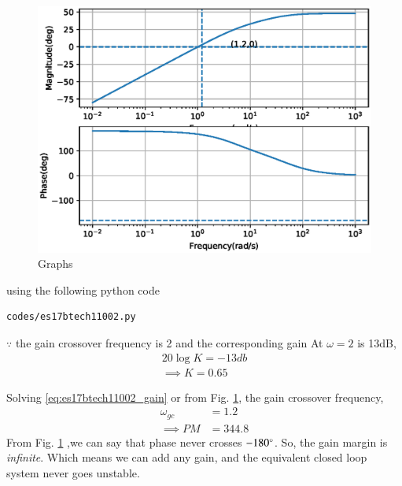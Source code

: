 \begin{enumerate}[label=\thesection.\arabic*.,ref=\thesection.\theenumi]
\begin{figure}[!h]
\centering
  \includegraphics[width=\columnwidth]{./figs/es17btech11002/es17btech11002.eps}
  \caption{Graphs}
  \label{fig:es17btech11002}
\end{figure}
using the following python code 
\begin{lstlisting}
codes/es17btech11002.py
\end{lstlisting}
%
$\because $ the gain crossover frequency is 2 and the corresponding gain 
At $\omega = 2$ is 13dB,
\begin{align}
20\log K= -13db
\\
\implies K= 0.65
\end{align}

Solving \eqref{eq:es17btech11002_gain} or from Fig. \ref{fig:es17btech11002}, the gain crossover frequency,
\begin{align}
\omega_{gc} &=  1.2 \\
\implies
PM &=344.8
\end{align}
 From Fig. \ref{fig:es17btech11002} ,we can say that phase  never crosses $-180\degree$.
So, the gain margin is {\em infinite}.
Which means we can add any gain, and the equivalent closed loop system never goes unstable.
\end{enumerate}
